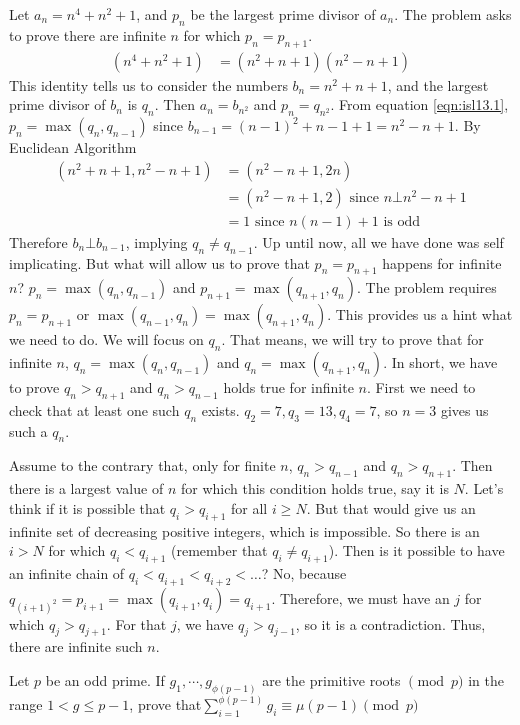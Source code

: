 \documentclass[problems.tex]{subfile}
\begin{document}
	\begin{solution}
		Let $a_n=n^4+n^2+1$, and $p_n$ be the largest prime divisor of $a_n$. The problem asks to prove there are infinite $n$ for which $p_n=p_{n+1}$.
			\begin{align}
				(n^4+n^2+1) & = (n^2+n+1)(n^2-n+1)\label{eqn:isl13.1}
			\end{align}
		This identity tells us to consider the numbers $b_n=n^2+n+1$, and the largest prime divisor of $b_n$ is $q_n$. Then $a_n=b_{n^2}$ and $p_n=q_{n^2}$. From equation \eqref{eqn:isl13.1}, $p_n=\max(q_n,q_{n-1})$ since $b_{n-1}=(n-1)^2+n-1+1=n^2-n+1$. By Euclidean Algorithm
			\begin{align*}
				(n^2+n+1,n^2-n+1) & = (n^2-n+1,2n)\\
								  & = (n^2-n+1,2)\text { since }n\bot n^2-n+1\\
								  & = 1\text { since }n(n-1)+1\text { is odd}
			\end{align*}
		Therefore $b_n\bot b_{n-1}$, implying $q_n\neq q_{n-1}$. Up until now, all we have done was self implicating. But what will allow us to prove that $p_n=p_{n+1}$ happens for infinite $n$? $p_n=\max(q_n,q_{n-1})$ and $p_{n+1}=\max(q_{n+1},q_n)$. The problem requires $p_n=p_{n+1}$ or $\max(q_{n-1},q_n)=\max(q_{n+1},q_n)$. This provides us a hint what we need to do. We will focus on $q_n$. That means, we will try to prove that for infinite $n$, $q_n=\max(q_n,q_{n-1})$ and $q_n=\max(q_{n+1},q_n)$. In short, we have to prove $q_n>q_{n+1}$ and $q_n>q_{n-1}$ holds true for infinite $n$. First we need to check that at least one such $q_n$ exists. $q_2=7,q_3=13,q_4=7$, so $n=3$ gives us such a $q_n$.
		
		Assume to the contrary that, only for finite $n$, $q_n>q_{n-1}$ and $q_n>q_{n+1}$. Then there is a largest value of $n$ for which this condition holds true, say it is $N$. Let's think if it is possible that $q_i>q_{i+1}$ for all $i\geq N$. But that would give us an infinite set of decreasing positive integers, which is impossible. So there is an $i>N$ for which $q_i<q_{i+1}$ (remember that $q_i\neq q_{i+1}$). Then is it possible to have an infinite chain of $q_i<q_{i+1}<q_{i+2}<\ldots$? No, because $q_{(i+1)^2}=p_{i+1}=\max(q_{i+1},q_i)=q_{i+1}$. Therefore, we must have an $j$ for which $q_j>q_{j+1}$. For that $j$, we have $q_j>q_{j-1}$, so it is a contradiction. Thus, there are infinite such $n$.
	\end{solution}
	
	\begin{problem}
		Let $p$ be an odd prime. If $g_{1}, \cdots, g_{\phi(p-1)}$ are the primitive roots $\pmod{p}$ in the range $1<g \le p-1$, prove that$ \sum_{i=1}^{\phi(p-1)}g_{i}\equiv \mu(p-1) \pmod{p}$
	\end{problem}
	
\end{document}
